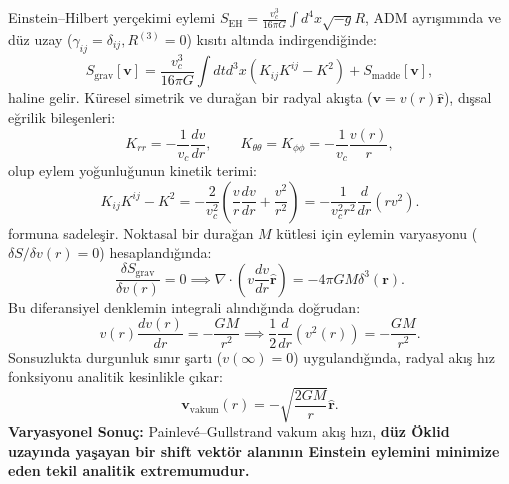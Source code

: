 Einstein--Hilbert yerçekimi eylemi $S_{\mathrm{EH}} = \frac{v_c^3}{16\pi G} \int d^4x \sqrt{-g} R$, ADM ayrışımında ve düz uzay ($\gamma_{ij} = \delta_{ij}, R^{(3)} = 0$) kısıtı altında indirgendiğinde:
\begin{equation}
    S_{\mathrm{grav}}[\mathbf{v}] = \frac{v_c^3}{16\pi G} \int dt d^3x \left( K_{ij} K^{ij} - K^2 \right) + S_{\mathrm{madde}}[\mathbf{v}],
    \label{eq:adm_grav_eylem}
\end{equation}
haline gelir. Küresel simetrik ve durağan bir radyal akışta ($\mathbf{v} = v(r) \hat{\mathbf{r}}$), dışsal eğrilik bileşenleri:
\begin{equation}
    K_{rr} = -\frac{1}{v_c} \frac{dv}{dr}, \qquad K_{\theta\theta} = K_{\phi\phi} = -\frac{1}{v_c} \frac{v(r)}{r},
\end{equation}
olup eylem yoğunluğunun kinetik terimi:
\begin{equation}
    K_{ij} K^{ij} - K^2 = -\frac{2}{v_c^2} \left( \frac{v}{r} \frac{dv}{dr} + \frac{v^2}{r^2} \right) = -\frac{1}{v_c^2 r^2} \frac{d}{dr}\left( r v^2 \right).
    \label{eq:kinetik_egrilik_ozdeslik}
\end{equation}
formuna sadeleşir. Noktasal bir durağan $M$ kütlesi için eylemin varyasyonu ($\delta S / \delta v(r) = 0$) hesaplandığında:
\begin{equation}
    \frac{\delta S_{\mathrm{grav}}}{\delta v(r)} = 0 \implies \nabla \cdot \left( v \frac{dv}{dr} \hat{\mathbf{r}} \right) = -4\pi G M \delta^3(\mathbf{r}).
    \label{eq:varyasyon_akis_sonuc}
\end{equation}
Bu diferansiyel denklemin integrali alındığında doğrudan:
\begin{equation}
    v(r) \frac{dv(r)}{dr} = -\frac{GM}{r^2} \implies \frac{1}{2} \frac{d}{dr}\left( v^2(r) \right) = -\frac{GM}{r^2}.
\end{equation}
Sonsuzlukta durgunluk sınır şartı ($v(\infty) = 0$) uygulandığında, radyal akış hız fonksiyonu analitik kesinlikle çıkar:
\begin{equation}
    \mathbf{v}_{\mathrm{vakum}}(r) = -\sqrt{\frac{2GM}{r}} \hat{\mathbf{r}}.
    \label{eq:vakum_cekis_hizi}
\end{equation}
\textbf{Varyasyonel Sonuç:} Painlevé--Gullstrand vakum akış hızı, \textbf{düz Öklid uzayında yaşayan bir shift vektör alanının Einstein eylemini minimize eden tekil analitik extremumudur.}

